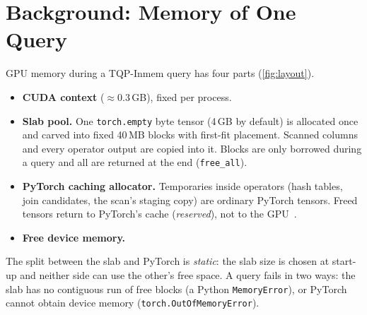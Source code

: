 \documentclass[10pt,twocolumn,letterpaper]{article}
\newcommand{\code}[1]{\texttt{\small #1}}
\begin{document}
\section{Background: Memory of One Query}
\label{sec:background}
GPU memory during a TQP-Inmem query has four parts (\cref{fig:layout}).
\begin{itemize}
\item \textbf{CUDA context} ($\approx$0.3\,GB), fixed per process.
\item \textbf{Slab pool.} One \code{torch.empty} byte tensor (4\,GB by default) is
  allocated once and carved into fixed 40\,MB blocks with first-fit placement. Scanned
  columns and every operator output are copied into it. Blocks are only borrowed during
  a query and all are returned at the end (\code{free\_all}).
\item \textbf{PyTorch caching allocator.} Temporaries inside operators (hash tables,
  join candidates, the scan's staging copy) are ordinary PyTorch tensors. Freed tensors
  return to PyTorch's cache (\emph{reserved}), not to the GPU~\cite{pytorchmem}.
\item \textbf{Free device memory.}
\end{itemize}
The split between the slab and PyTorch is \emph{static}: the slab size is chosen at
start-up and neither side can use the other's free space. A query fails in two ways:
the slab has no contiguous run of free blocks (a Python \code{MemoryError}), or PyTorch
cannot obtain device memory (\code{torch.OutOfMemoryError}).
\end{document}
